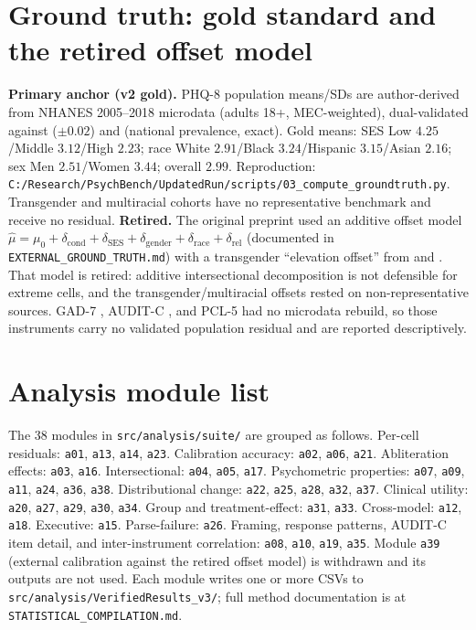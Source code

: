 \documentclass[11pt]{article}
\begin{document}
\section{Ground truth: gold standard and the retired offset model}
\begin{sloppypar}
\textbf{Primary anchor (v2 gold).} PHQ-8 population means/SDs are author-derived from NHANES 2005--2018 microdata (adults 18+, MEC-weighted), dual-validated against \citet{stewart2019phq9} ($\pm0.02$) and \citet{brody2018} (national prevalence, exact). Gold means: SES Low $4.25$/Middle $3.12$/High $2.23$; race White $2.91$/Black $3.24$/Hispanic $3.15$/Asian $2.16$; sex Men $2.51$/Women $3.44$; overall $2.99$. Reproduction: \texttt{C:/Research/PsychBench/UpdatedRun/scripts/03\_compute\_groundtruth.py}. Transgender and multiracial cohorts have no representative benchmark and receive no residual.
\textbf{Retired.} The original preprint used an additive offset model $\hat\mu = \mu_0 + \delta_{\text{cond}} + \delta_{\text{SES}} + \delta_{\text{gender}} + \delta_{\text{race}} + \delta_{\text{rel}}$ (documented in \texttt{EXTERNAL\_GROUND\_TRUTH.md}) with a transgender ``elevation offset'' from \citet{kidd2023} and \citet{hajek2023}. That model is retired: additive intersectional decomposition is not defensible for extreme cells, and the transgender/multiracial offsets rested on non-representative sources. GAD-7 \citep{terlizzi2024}, AUDIT-C \citep{samhsa2024nsduh}, and PCL-5 \citep{roberts2011,goldstein2016} had no microdata rebuild, so those instruments carry no validated population residual and are reported descriptively.
\end{sloppypar}

\section{Analysis module list}
The 38 modules in \texttt{src/analysis/suite/} are grouped as follows. Per-cell residuals: \texttt{a01}, \texttt{a13}, \texttt{a14}, \texttt{a23}. Calibration accuracy: \texttt{a02}, \texttt{a06}, \texttt{a21}. Abliteration effects: \texttt{a03}, \texttt{a16}. Intersectional: \texttt{a04}, \texttt{a05}, \texttt{a17}. Psychometric properties: \texttt{a07}, \texttt{a09}, \texttt{a11}, \texttt{a24}, \texttt{a36}, \texttt{a38}. Distributional change: \texttt{a22}, \texttt{a25}, \texttt{a28}, \texttt{a32}, \texttt{a37}. Clinical utility: \texttt{a20}, \texttt{a27}, \texttt{a29}, \texttt{a30}, \texttt{a34}. Group and treatment-effect: \texttt{a31}, \texttt{a33}. Cross-model: \texttt{a12}, \texttt{a18}. Executive: \texttt{a15}. Parse-failure: \texttt{a26}. Framing, response patterns, AUDIT-C item detail, and inter-instrument correlation: \texttt{a08}, \texttt{a10}, \texttt{a19}, \texttt{a35}. Module \texttt{a39} (external calibration against the retired offset model) is withdrawn and its outputs are not used. Each module writes one or more CSVs to \texttt{src/analysis/VerifiedResults\_v3/}; full method documentation is at \texttt{STATISTICAL\_COMPILATION.md}.
\end{document}
